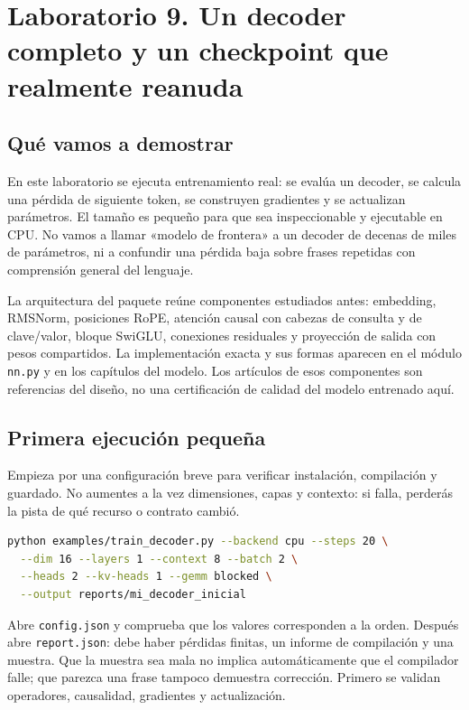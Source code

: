 \documentclass[12pt,a4paper,oneside]{report}
\begin{document}
\chapter{Laboratorio 9. Un decoder completo y un checkpoint que realmente reanuda}
\label{lab:nueve}
\section{Qué vamos a demostrar}
En este laboratorio se ejecuta entrenamiento real: se evalúa un decoder, se calcula una pérdida de siguiente token, se construyen gradientes y se actualizan parámetros. El tamaño es pequeño para que sea inspeccionable y ejecutable en CPU. No vamos a llamar «modelo de frontera» a un decoder de decenas de miles de parámetros, ni a confundir una pérdida baja sobre frases repetidas con comprensión general del lenguaje.

La arquitectura del paquete reúne componentes estudiados antes: embedding, RMSNorm, posiciones RoPE, atención causal con cabezas de consulta y de clave/valor, bloque SwiGLU, conexiones residuales y proyección de salida con pesos compartidos. La implementación exacta y sus formas aparecen en el módulo \texttt{nn.py} y en los capítulos del modelo. Los artículos de esos componentes son referencias del diseño, no una certificación de calidad del modelo entrenado aquí. \cite{gqa,rope,rmsnorm,swiglu}

\section{Primera ejecución pequeña}
Empieza por una configuración breve para verificar instalación, compilación y guardado. No aumentes a la vez dimensiones, capas y contexto: si falla, perderás la pista de qué recurso o contrato cambió.

\begin{lstlisting}[language=bash]
python examples/train_decoder.py --backend cpu --steps 20 \
  --dim 16 --layers 1 --context 8 --batch 2 \
  --heads 2 --kv-heads 1 --gemm blocked \
  --output reports/mi_decoder_inicial
\end{lstlisting}
Abre \texttt{config.json} y comprueba que los valores corresponden a la orden. Después abre \texttt{report.json}: debe haber pérdidas finitas, un informe de compilación y una muestra. Que la muestra sea mala no implica automáticamente que el compilador falle; que parezca una frase tampoco demuestra corrección. Primero se validan operadores, causalidad, gradientes y actualización.
\end{document}
